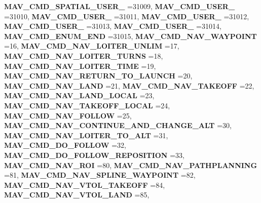 \begin{DoxyCompactItemize}
\textbf{ M\+A\+V\+\_\+\+C\+M\+D\+\_\+\+S\+P\+A\+T\+I\+A\+L\+\_\+\+U\+S\+E\+R\+\_} =31009, 
\textbf{ M\+A\+V\+\_\+\+C\+M\+D\+\_\+\+U\+S\+E\+R\+\_} =31010, 
\newline
\textbf{ M\+A\+V\+\_\+\+C\+M\+D\+\_\+\+U\+S\+E\+R\+\_} =31011, 
\textbf{ M\+A\+V\+\_\+\+C\+M\+D\+\_\+\+U\+S\+E\+R\+\_} =31012, 
\textbf{ M\+A\+V\+\_\+\+C\+M\+D\+\_\+\+U\+S\+E\+R\+\_} =31013, 
\textbf{ M\+A\+V\+\_\+\+C\+M\+D\+\_\+\+U\+S\+E\+R\+\_} =31014, 
\newline
\textbf{ M\+A\+V\+\_\+\+C\+M\+D\+\_\+\+E\+N\+U\+M\+\_\+\+E\+ND} =31015, 
\textbf{ M\+A\+V\+\_\+\+C\+M\+D\+\_\+\+N\+A\+V\+\_\+\+W\+A\+Y\+P\+O\+I\+NT} =16, 
\textbf{ M\+A\+V\+\_\+\+C\+M\+D\+\_\+\+N\+A\+V\+\_\+\+L\+O\+I\+T\+E\+R\+\_\+\+U\+N\+L\+IM} =17, 
\textbf{ M\+A\+V\+\_\+\+C\+M\+D\+\_\+\+N\+A\+V\+\_\+\+L\+O\+I\+T\+E\+R\+\_\+\+T\+U\+R\+NS} =18, 
\newline
\textbf{ M\+A\+V\+\_\+\+C\+M\+D\+\_\+\+N\+A\+V\+\_\+\+L\+O\+I\+T\+E\+R\+\_\+\+T\+I\+ME} =19, 
\textbf{ M\+A\+V\+\_\+\+C\+M\+D\+\_\+\+N\+A\+V\+\_\+\+R\+E\+T\+U\+R\+N\+\_\+\+T\+O\+\_\+\+L\+A\+U\+N\+CH} =20, 
\textbf{ M\+A\+V\+\_\+\+C\+M\+D\+\_\+\+N\+A\+V\+\_\+\+L\+A\+ND} =21, 
\textbf{ M\+A\+V\+\_\+\+C\+M\+D\+\_\+\+N\+A\+V\+\_\+\+T\+A\+K\+E\+O\+FF} =22, 
\newline
\textbf{ M\+A\+V\+\_\+\+C\+M\+D\+\_\+\+N\+A\+V\+\_\+\+L\+A\+N\+D\+\_\+\+L\+O\+C\+AL} =23, 
\textbf{ M\+A\+V\+\_\+\+C\+M\+D\+\_\+\+N\+A\+V\+\_\+\+T\+A\+K\+E\+O\+F\+F\+\_\+\+L\+O\+C\+AL} =24, 
\textbf{ M\+A\+V\+\_\+\+C\+M\+D\+\_\+\+N\+A\+V\+\_\+\+F\+O\+L\+L\+OW} =25, 
\textbf{ M\+A\+V\+\_\+\+C\+M\+D\+\_\+\+N\+A\+V\+\_\+\+C\+O\+N\+T\+I\+N\+U\+E\+\_\+\+A\+N\+D\+\_\+\+C\+H\+A\+N\+G\+E\+\_\+\+A\+LT} =30, 
\newline
\textbf{ M\+A\+V\+\_\+\+C\+M\+D\+\_\+\+N\+A\+V\+\_\+\+L\+O\+I\+T\+E\+R\+\_\+\+T\+O\+\_\+\+A\+LT} =31, 
\textbf{ M\+A\+V\+\_\+\+C\+M\+D\+\_\+\+D\+O\+\_\+\+F\+O\+L\+L\+OW} =32, 
\textbf{ M\+A\+V\+\_\+\+C\+M\+D\+\_\+\+D\+O\+\_\+\+F\+O\+L\+L\+O\+W\+\_\+\+R\+E\+P\+O\+S\+I\+T\+I\+ON} =33, 
\textbf{ M\+A\+V\+\_\+\+C\+M\+D\+\_\+\+N\+A\+V\+\_\+\+R\+OI} =80, 
\newline
\textbf{ M\+A\+V\+\_\+\+C\+M\+D\+\_\+\+N\+A\+V\+\_\+\+P\+A\+T\+H\+P\+L\+A\+N\+N\+I\+NG} =81, 
\textbf{ M\+A\+V\+\_\+\+C\+M\+D\+\_\+\+N\+A\+V\+\_\+\+S\+P\+L\+I\+N\+E\+\_\+\+W\+A\+Y\+P\+O\+I\+NT} =82, 
\textbf{ M\+A\+V\+\_\+\+C\+M\+D\+\_\+\+N\+A\+V\+\_\+\+V\+T\+O\+L\+\_\+\+T\+A\+K\+E\+O\+FF} =84, 
\textbf{ M\+A\+V\+\_\+\+C\+M\+D\+\_\+\+N\+A\+V\+\_\+\+V\+T\+O\+L\+\_\+\+L\+A\+ND} =85, 
\newline

\end{DoxyCompactItemize}

